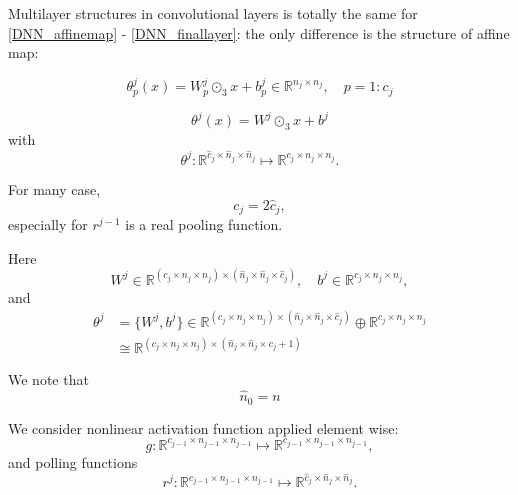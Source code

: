 Multilayer structures in convolutional layers is totally the same for \eqref{DNN_affinemap} - \eqref{DNN_finallayer}: the only difference  is the structure of affine map:

\begin{equation}\label{CNN_affinemap}
\theta^j_{p}(x) =  W^j_p \odot_3 x + b^j_p \in \mathbb R^{n_j \times n_j}, \quad p=1:c_j
\end{equation}

\begin{equation}\label{CNN_affinemap}
\theta^j(x) =  W^j\odot_3 x + b^j
\end{equation}
with 
\begin{equation}
\theta^j: \mathbb R^{\hat c_j  \times \hat{n}_{j} \times \hat n_{j} } \mapsto \mathbb{R}^{c_j \times n_{j} \times n_j }.
\end{equation}
\begin{remark}
	For many case, 
	\begin{equation}
	c_j = 2 \hat c_j,
	\end{equation}
	especially for $r^{j-1}$ is a real pooling function. 
\end{remark}
Here
\begin{equation}
W^j \in \mathbb{R}^{(c_j \times n_{j} \times n_j) \times
	(\hat{n}_{j} \times \hat n_{j}\times \hat c_{j} )}, \quad
b^j\in  \mathbb R^{c_j \times n_{j} \times n_j},  
\end{equation}
and 
\begin{align}
\theta^j  &= \{W^j , b^j\}  \in \mathbb{R}^{(c_j \times n_{j} \times n_j) \times
	(\hat{n}_{j} \times \hat n_{j}\times \hat c_{j} )} \oplus \mathbb R^{c_j \times n_{j} \times n_j} \\ 
&\cong  \mathbb{R}^{(c_j \times n_{j} \times n_j) \times
	(\hat{n}_{j} \times \hat n_{j}\times c_{j} + 1 )}
\end{align}

We note that
\begin{equation}
\hat n_0 =n  
\end{equation}

We consider nonlinear activation function applied element wise:
\begin{equation}\label{CNN_iteration_vector}
g: \mathbb R^{c_{j-1} \times n_{j-1} \times n_{j-1} }\mapsto  \mathbb R^{c_{j-1} \times n_{j-1} \times n_{j-1}},
\end{equation}
and polling functions
\begin{equation}\label{CNN_iteration_vector}
r^j: \mathbb R^{c_{j-1} \times n_{j-1} \times n_{j-1} }\mapsto  \mathbb R^{\hat c_j \times \hat n_{j} \times\hat n_j }. 
\end{equation}


